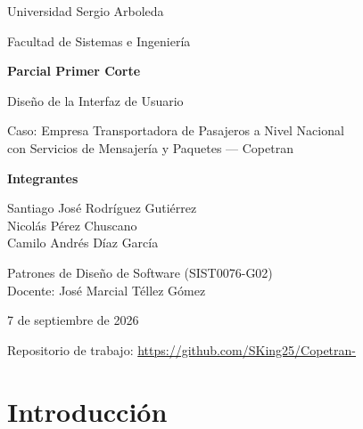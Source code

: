 \documentclass[11pt,a4paper]{article}
\begin{document}
\begin{titlepage}
  \centering
  \vspace*{2cm}
  {\Large Universidad Sergio Arboleda\par}
  \vspace{0.3cm}
  {\large Facultad de Sistemas e Ingeniería\par}
  \vspace{2cm}

  {\huge\bfseries Parcial Primer Corte\par}
  \vspace{0.5cm}
  {\Large Diseño de la Interfaz de Usuario\par}
  \vspace{0.3cm}
  {\large Caso: Empresa Transportadora de Pasajeros a Nivel Nacional\\ con Servicios de Mensajería y Paquetes --- Copetran\par}

  \vspace{2.5cm}
  {\large\bfseries Integrantes\par}
  \vspace{0.3cm}
  {\large
    Santiago José Rodríguez Gutiérrez\\
    Nicolás Pérez Chuscano\\
    Camilo Andrés Díaz García\par
  }

  \vspace{2.5cm}
  {\large Patrones de Diseño de Software (SIST0076-G02)\\
  Docente: José Marcial Téllez Gómez\par}

  \vspace{1.5cm}
  {\large 7 de septiembre de 2026\par}

  \vfill
  {\small Repositorio de trabajo: \url{https://github.com/SKing25/Copetran-}\par}
\end{titlepage}

\tableofcontents
\newpage

\section{Introducción}
\end{document}
